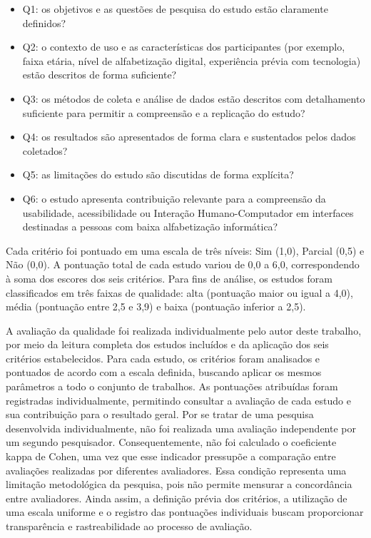 \begin{itemize}

    \item Q1: os objetivos e as questões de pesquisa do estudo estão claramente definidos?

    \item Q2: o contexto de uso e as características dos participantes (por exemplo, faixa etária, nível de alfabetização digital, experiência prévia com tecnologia) estão descritos de forma suficiente?

    \item Q3: os métodos de coleta e análise de dados estão descritos com detalhamento suficiente para permitir a compreensão e a replicação do estudo?

    \item Q4: os resultados são apresentados de forma clara e sustentados pelos dados coletados?

    \item Q5: as limitações do estudo são discutidas de forma explícita?

    \item Q6: o estudo apresenta contribuição relevante para a compreensão da usabilidade, acessibilidade ou Interação Humano-Computador em interfaces destinadas a pessoas com baixa alfabetização informática?

\end{itemize}

Cada critério foi pontuado em uma escala de três níveis: Sim (1,0), Parcial (0,5) e Não (0,0). A pontuação total de cada estudo variou de 0,0 a 6,0, correspondendo à soma dos escores dos seis critérios. Para fins de análise, os estudos foram classificados em três faixas de qualidade: alta (pontuação maior ou igual a 4,0), média (pontuação entre 2,5 e 3,9) e baixa (pontuação inferior a 2,5).

A avaliação da qualidade foi realizada individualmente pelo autor deste trabalho, por meio da leitura completa dos estudos incluídos e da aplicação dos seis critérios estabelecidos. Para cada estudo, os critérios foram analisados e pontuados de acordo com a escala definida, buscando aplicar os mesmos parâmetros a todo o conjunto de trabalhos. As pontuações atribuídas foram registradas individualmente, permitindo consultar a avaliação de cada estudo e sua contribuição para o resultado geral. Por se tratar de uma pesquisa desenvolvida individualmente, não foi realizada uma avaliação independente por um segundo pesquisador. Consequentemente, não foi calculado o coeficiente kappa de Cohen, uma vez que esse indicador pressupõe a comparação entre avaliações realizadas por diferentes avaliadores. Essa condição representa uma limitação metodológica da pesquisa, pois não permite mensurar a concordância entre avaliadores. Ainda assim, a definição prévia dos critérios, a utilização de uma escala uniforme e o registro das pontuações individuais buscam proporcionar transparência e rastreabilidade ao processo de avaliação.

